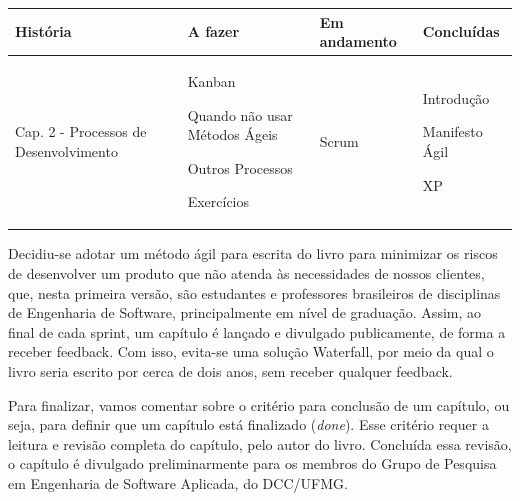 \documentclass[
  11pt,
  twoside]{book}
\begin{document}
\begin{longtable}[]{@{}llll@{}}
\toprule
\begin{minipage}[b]{0.22\columnwidth}\raggedright
\textbf{História}\strut
\end{minipage} & \begin{minipage}[b]{0.21\columnwidth}\raggedright
\textbf{A fazer}\strut
\end{minipage} & \begin{minipage}[b]{0.21\columnwidth}\raggedright
\textbf{Em andamento}\strut
\end{minipage} & \begin{minipage}[b]{0.21\columnwidth}\raggedright
\textbf{Concluídas}\strut
\end{minipage}\tabularnewline
\midrule
\endhead
\begin{minipage}[t]{0.22\columnwidth}\raggedright
Cap. 2 - Processos de Desenvolvimento\strut
\end{minipage} & \begin{minipage}[t]{0.21\columnwidth}\raggedright
Kanban

Quando não usar Métodos Ágeis

Outros Processos

Exercícios\strut
\end{minipage} & \begin{minipage}[t]{0.21\columnwidth}\raggedright
Scrum\strut
\end{minipage} & \begin{minipage}[t]{0.21\columnwidth}\raggedright
Introdução

Manifesto Ágil

XP\strut
\end{minipage}\tabularnewline
\bottomrule
\end{longtable}

Decidiu-se adotar um método ágil para escrita do livro para minimizar os
riscos de desenvolver um produto que não atenda às necessidades de
nossos clientes, que, nesta primeira versão, são estudantes e
professores brasileiros de disciplinas de Engenharia de Software,
principalmente em nível de graduação. Assim, ao final de cada sprint, um
capítulo é lançado e divulgado publicamente, de forma a receber
feedback. Com isso, evita-se uma solução Waterfall, por meio da qual o
livro seria escrito por cerca de dois anos, sem receber qualquer
feedback.

Para finalizar, vamos comentar sobre o critério para conclusão de um
capítulo, ou seja, para definir que um capítulo está finalizado
(\emph{done}). Esse critério requer a leitura e revisão completa do
capítulo, pelo autor do livro. Concluída essa revisão, o capítulo é
divulgado preliminarmente para os membros do Grupo de Pesquisa em
Engenharia de Software Aplicada, do DCC/UFMG.
\end{document}
